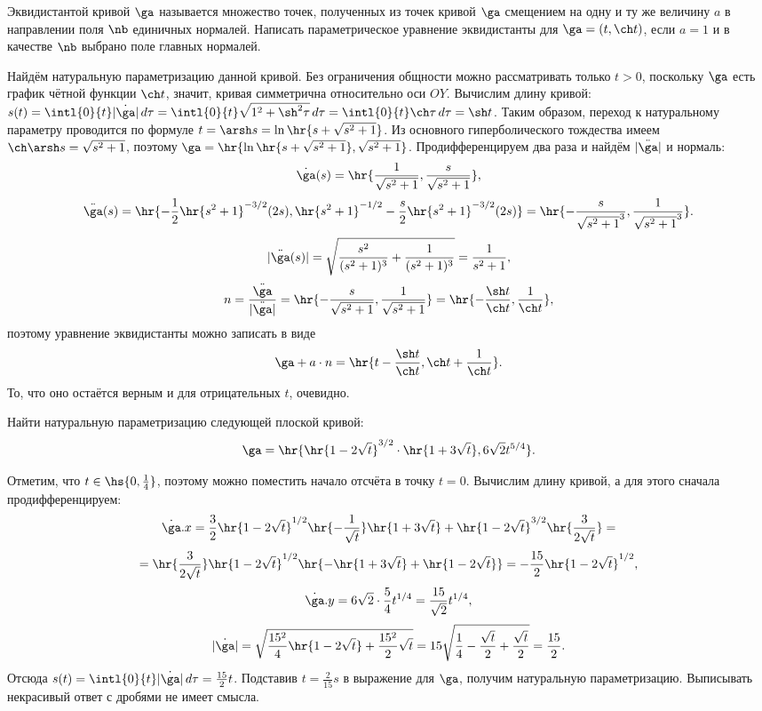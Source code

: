 \documentclass[a4paper]{article}
\newcommand{\gd}{\dot{\ga}}
\newcommand{\gdd}{\ddot{\ga}}
\begin{document}
\begin{problem}
Эквидистантой кривой $\ga$ называется множество точек, полученных из точек кривой $\ga$ смещением
на одну и ту же величину $a$ в направлении поля $\nb$ единичных нормалей. Написать параметрическое
уравнение эквидистанты для $\ga = (t, \ch t)$, если $a = 1$ и в качестве $\nb$ выбрано поле главных нормалей.
\end{problem}
\begin{solution}
Найдём натуральную параметризацию данной кривой. Без ограничения общности можно рассматривать только $t > 0$,
поскольку $\ga$ есть график чётной функции $\ch t$, значит, кривая симметрична относительно оси $OY$.
Вычислим длину кривой: $s(t) = \intl{0}{t}|\gd|\,d  \tau = \intl{0}{t}\sqrt{1^2 + \sh^2\tau}\,d  \tau = \intl{0}{t}\ch\tau\,d  \tau = \sh t$.
Таким образом, переход к натуральному параметру проводится по формуле $t = \arsh s = \ln\hr{s + \sqrt{s^2 + 1}}$.
Из основного гиперболического тождества имеем $\ch\arsh s = \sqrt{s^2 + 1}$, поэтому $\ga = \hr{\ln\hr{s + \sqrt{s^2 + 1}}, \sqrt{s^2 + 1}}$.
Продифференцируем два раза и найдём $|\gdd|$ и нормаль:
$$\gd(s) = \hr{\frac{1}{\sqrt{s^2 + 1}}, \frac{s}{\sqrt{s^2 + 1}}},$$
$$\gdd(s) = \hr{-\frac12\hr{s^2+1}^{-3/2}(2s), \hr{s^2 + 1}^{-1/2} - \frac s2\hr{s^2+1}^{-3/2}(2s)} = \hr{-\frac{s}{\sqrt{s^2 + 1}^3}, \frac{1}{\sqrt{s^2 + 1}^3}}.$$
$$|\gdd(s)| = \sqrt{\frac{s^2}{(s^2+1)^3} + \frac{1}{(s^2 + 1)^3}} = \frac{1}{s^2 + 1},$$
$$n = \frac{\gdd}{|\gdd|} = \hr{-\frac{s}{\sqrt{s^2 + 1}}, \frac{1}{\sqrt{s^2 + 1}}} = \hr{-\frac{\sh t}{\ch t}, \frac{1}{\ch t}},$$
поэтому уравнение эквидистанты можно записать в виде
$$\ga + a\cdot n = \hr{t-\frac{\sh t}{\ch t}, \ch t + \frac{1}{\ch t}}.$$
То, что оно остаётся верным и для отрицательных $t$, очевидно.
\end{solution}

\begin{problem}
Найти натуральную параметризацию следующей плоской кривой:
$$\ga = \hr{\hr{1 - 2\sqrt{t}}^{3/2}\cdot\hr{1 + 3\sqrt{t}}, 6\sqrt{2}t^{5/4}}.$$
\end{problem}
\begin{solution}
Отметим, что $t \in \hs{0, \frac{1}{4}}$, поэтому можно поместить начало отсчёта в точку $t = 0$.
Вычислим длину кривой, а для этого сначала продифференцируем:
$$\gd.x = \frac32\hr{1-2\sqrt{t}}^{1/2}\hr{-\frac1{\sqrt{t}}}\hr{1+3\sqrt{t}} + \hr{1 -2\sqrt{t}}^{3/2}\hr{\frac3{2\sqrt{t}}}=$$
$$=\hr{\frac3{2\sqrt{t}}}\hr{1 -2\sqrt{t}}^{1/2}\hr{-\hr{1+3\sqrt{t}} + \hr{1-2\sqrt{t}}} = -\frac{15}2\hr{1 - 2\sqrt{t}}^{1/2},$$
$$\gd.y = 6\sqrt{2}\cdot \frac54t^{1/4} = \frac{15}{\sqrt{2}}t^{1/4},$$
$$|\gd| = \sqrt{\frac{15^2}4\hr{1-2\sqrt{t}} + \frac{15^2}2\sqrt{t}} = 15\sqrt{\frac14 -\frac{\sqrt{t}}{2} + \frac{\sqrt{t}}{2}} = \frac{15}2.$$
Отсюда $s(t) = \intl{0}{t}|\gd|\,d  \tau = \frac{15}2t$. Подставив $t = \frac2{15}s$ в выражение для $\ga$, получим натуральную параметризацию.
Выписывать некрасивый ответ с дробями не имеет смысла.
\end{solution}
\end{document}

